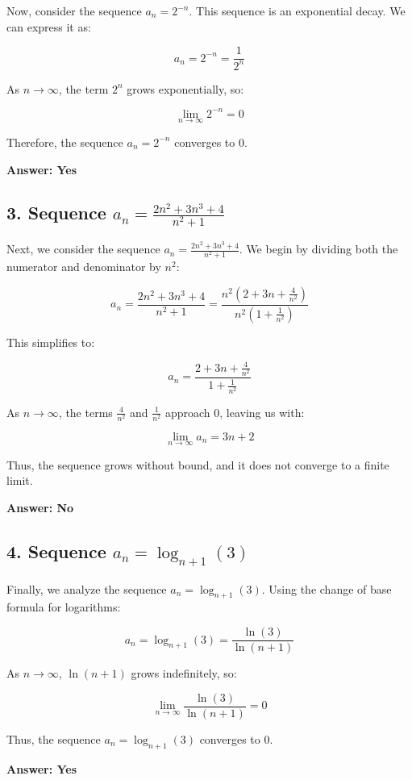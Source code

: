 \documentclass{article}
\begin{document}
Now, consider the sequence \( a_n = 2^{-n} \). This sequence is an exponential decay. We can express it as:

\[
a_n = 2^{-n} = \frac{1}{2^n}
\]

As \( n \to \infty \), the term \( 2^n \) grows exponentially, so:

\[
\lim_{n \to \infty} 2^{-n} = 0
\]

Therefore, the sequence \( a_n = 2^{-n} \) converges to 0.

\textbf{Answer: Yes}

\subsection*{3. Sequence \( a_n = \frac{2n^2 + 3n^3 + 4}{n^2 + 1} \)}

Next, we consider the sequence \( a_n = \frac{2n^2 + 3n^3 + 4}{n^2 + 1} \). We begin by dividing both the numerator and denominator by \( n^2 \):

\[
a_n = \frac{2n^2 + 3n^3 + 4}{n^2 + 1} = \frac{n^2(2 + 3n + \frac{4}{n^2})}{n^2(1 + \frac{1}{n^2})}
\]

This simplifies to:

\[
a_n = \frac{2 + 3n + \frac{4}{n^2}}{1 + \frac{1}{n^2}}
\]

As \( n \to \infty \), the terms \( \frac{4}{n^2} \) and \( \frac{1}{n^2} \) approach 0, leaving us with:

\[
\lim_{n \to \infty} a_n = 3n + 2
\]

Thus, the sequence grows without bound, and it does not converge to a finite limit.

\textbf{Answer: No}

\subsection*{4. Sequence \( a_n = \log_{n+1}(3) \)}

Finally, we analyze the sequence \( a_n = \log_{n+1}(3) \). Using the change of base formula for logarithms:

\[
a_n = \log_{n+1}(3) = \frac{\ln(3)}{\ln(n+1)}
\]

As \( n \to \infty \), \( \ln(n+1) \) grows indefinitely, so:

\[
\lim_{n \to \infty} \frac{\ln(3)}{\ln(n+1)} = 0
\]

Thus, the sequence \( a_n = \log_{n+1}(3) \) converges to 0.

\textbf{Answer: Yes}
\end{document}
